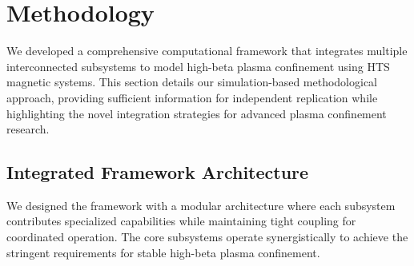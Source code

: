 \documentclass[10pt,twocolumn]{article}
\begin{document}
\section{Methodology}

We developed a comprehensive computational framework that integrates multiple interconnected subsystems to model high-beta plasma confinement using HTS magnetic systems. This section details our simulation-based methodological approach, providing sufficient information for independent replication while highlighting the novel integration strategies for advanced plasma confinement research.

\subsection{Integrated Framework Architecture}

We designed the framework with a modular architecture where each subsystem contributes specialized capabilities while maintaining tight coupling for coordinated operation. The core subsystems operate synergistically to achieve the stringent requirements for stable high-beta plasma confinement.
\end{document}
